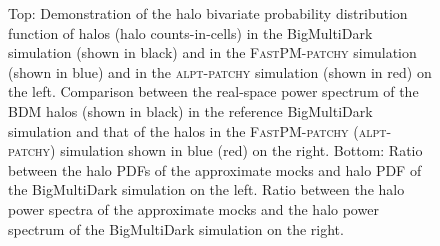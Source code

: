 \documentclass[english,usenatbib]{mn2e}
\begin{document}
\begin{figure}
\begin{tabular}{cc}
\end{tabular}
\caption{\label{fig:pdfpower} Top: Demonstration of the halo bivariate probability distribution function of halos (halo counts-in-cells) in the BigMultiDark simulation (shown in black) and in the \textsc{FastPM}-\textsc{patchy} simulation (shown in blue) and in the \textsc{alpt}-\textsc{patchy} simulation (shown in red) on the left. Comparison between the real-space power spectrum of the BDM halos (shown in black) in the reference BigMultiDark simulation and that of the halos in the \textsc{FastPM}-\textsc{patchy} (\textsc{alpt}-\textsc{patchy}) simulation shown in blue (red) on the right. 
Bottom: Ratio between the halo PDFs of the approximate mocks and halo PDF of the BigMultiDark simulation on the left. Ratio between the halo power spectra of the approximate mocks and the halo power spectrum of the BigMultiDark simulation on the right.}
\end{figure}
\end{document}

